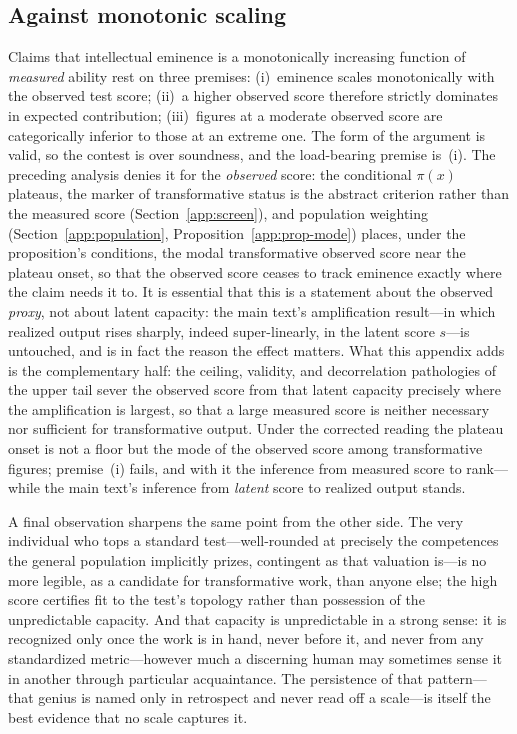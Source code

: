 \documentclass{article}
\begin{document}
\subsection{Against monotonic scaling}\label{app:monotone}
Claims that intellectual eminence is a monotonically increasing function of \emph{measured} ability rest on three premises: (i)~eminence scales monotonically with the observed test score; (ii)~a higher observed score therefore strictly dominates in expected contribution; (iii)~figures at a moderate observed score are categorically inferior to those at an extreme one. The form of the argument is valid, so the contest is over soundness, and the load-bearing premise is~(i). The preceding analysis denies it for the \emph{observed} score: the conditional $\pi(x)$ plateaus, the marker of transformative status is the abstract criterion rather than the measured score (Section~\ref{app:screen}), and population weighting (Section~\ref{app:population}, Proposition~\ref{app:prop-mode}) places, under the proposition's conditions, the modal transformative observed score near the plateau onset, so that the observed score ceases to track eminence exactly where the claim needs it to. It is essential that this is a statement about the observed \emph{proxy}, not about latent capacity: the main text's amplification result---in which realized output rises sharply, indeed super-linearly, in the latent score $s$---is untouched, and is in fact the reason the effect matters. What this appendix adds is the complementary half: the ceiling, validity, and decorrelation pathologies of the upper tail sever the observed score from that latent capacity precisely where the amplification is largest, so that a large measured score is neither necessary nor sufficient for transformative output. Under the corrected reading the plateau onset is not a floor but the mode of the observed score among transformative figures; premise~(i) fails, and with it the inference from measured score to rank---while the main text's inference from \emph{latent} score to realized output stands.

A final observation sharpens the same point from the other side. The very individual who tops a standard test---well-rounded at precisely the competences the general population implicitly prizes, contingent as that valuation is---is no more legible, as a candidate for transformative work, than anyone else; the high score certifies fit to the test's topology rather than possession of the unpredictable capacity. And that capacity is unpredictable in a strong sense: it is recognized only once the work is in hand, never before it, and never from any standardized metric---however much a discerning human may sometimes sense it in another through particular acquaintance. The persistence of that pattern---that genius is named only in retrospect and never read off a scale---is itself the best evidence that no scale captures it.
\end{document}
